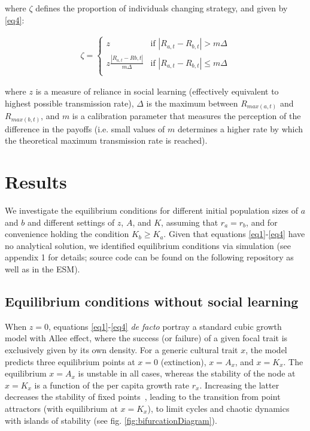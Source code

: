 \documentclass[3p,authoryear,twocolumn]{elsarticle} %
\begin{document}
where $\zeta$ defines the proportion of individuals changing strategy, and given by \eqref{eq4}:

\begin{equation}
\begin{aligned}
\label{eq4}
\zeta = 
\begin{cases}
z& \text{if }|R_{a,t}-R_{b,t}| > m\Delta\\
z\frac{|R_{a,t}-R{b,t}|}{m\Delta}& \text{if }|R_{a,t}-R_{b,t}| \leq m\Delta\\
\end{cases}
\end{aligned}
\end{equation}

where $z$ is a measure of reliance in social learning (effectively equivalent to highest possible transmission rate), $\Delta$ is the maximum between $R_{max(a,t)}$ and $R_{max(b,t)}$, and $m$ is a calibration parameter that measures the perception of the difference in the payoffs (i.e. small values of $m$ determines a higher rate by which the theoretical maximum transmission rate is reached). 

\section{Results}

We investigate the equilibrium conditions for different initial population sizes of  $a$ and $b$ and different settings of $z$, $A$, and $K$, assuming that  $r_a=r_b$, and for convenience holding the condition $K_b \geq K_a$. Given that equations \ref{eq1}-\ref{eq4} have no analytical solution, we identified equilibrium conditions via simulation (see appendix 1 for details; source code can be found on the following repository %
as well as in the ESM).  

\subsection{Equilibrium conditions without social learning}

When $z=0$, equations \ref{eq1}-\ref{eq4} \emph{de facto} portray a standard cubic growth model with Allee effect, where the success (or failure) of a given focal trait is exclusively given by its own density. For a generic cultural trait $x$, the model predicts three equilibrium points at $x=0$ (extinction), $x=A_x$, and $x=K_x$. The equilibrium $x=A_x$ is unstable in all cases, whereas the stability of the node at $x=K_x$ is a function of the per capita growth rate $r_x$. Increasing the latter decreases the stability of fixed points~\citep{scheuring_1999}, leading to the transition from point attractors (with equilibrium at $x=K_x$), to limit cycles and chaotic dynamics with islands of stability (see fig. \ref{fig:bifurcationDiagram}). 
\end{document}
